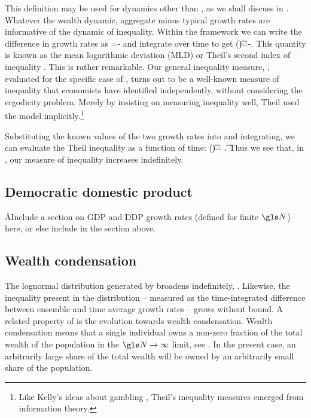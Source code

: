This definition may be used for dynamics other than \GBM, as we shall discuss in . Whatever the wealth dynamic, aggregate minus typical growth rates are informative of the dynamic of inequality. Within the \GBM framework we can write the difference in growth rates as 
\be
\frac{\gd \J}{\gd\t}=\frac{\gd \ln \ave{\x}}{\gd\t}-\frac{\gd \ave{\ln \x}}{\gd\t}
\ee
and integrate over time to get
\be
\J(\t)=\ln \ave{\x(\t)}-\ave{\ln \x(\t)}.
\ee
This quantity is known as the mean logarithmic deviation (MLD) or Theil's second index of inequality \cite{Theil1967}. This is rather remarkable. Our general inequality measure, , evaluated for the specific case of \GBM, turns out to be a well-known measure of inequality that economists have identified independently, without considering the ergodicity problem. Merely by insisting on measuring inequality well, Theil used the \GBM model implicitly.\footnote{Like Kelly's ideas about gambling \cite{Kelly1956}, Theil's inequality measures emerged from information theory.}

Substituting the known values of the two growth rates into  and integrating, we can evaluate the Theil inequality as a function of time:
\be
\J(\t)= \t.
\ee
Thus we see that, in \GBM, our measure of inequality increases indefinitely.


\subsection{Democratic domestic product}

\AA{Include a section on GDP and DDP growth rates (defined for finite $\N$) here, or else include in the section above.}

\subsection{Wealth condensation}
The lognormal distribution generated by \GBM broadens indefinitely, . Likewise, the inequality present in the distribution -- measured as the time-integrated difference between ensemble and time average growth rates -- grows without bound. A related property of \GBM is the evolution towards wealth condensation. Wealth condensation means that a single individual owns a non-zero fraction of the total wealth of the population in the $\N\to\infty$ limit, see \eg \cite{BouchaudMezard2000}. In the present case, an arbitrarily large share of the  total wealth will be owned by an arbitrarily small share of the population.

